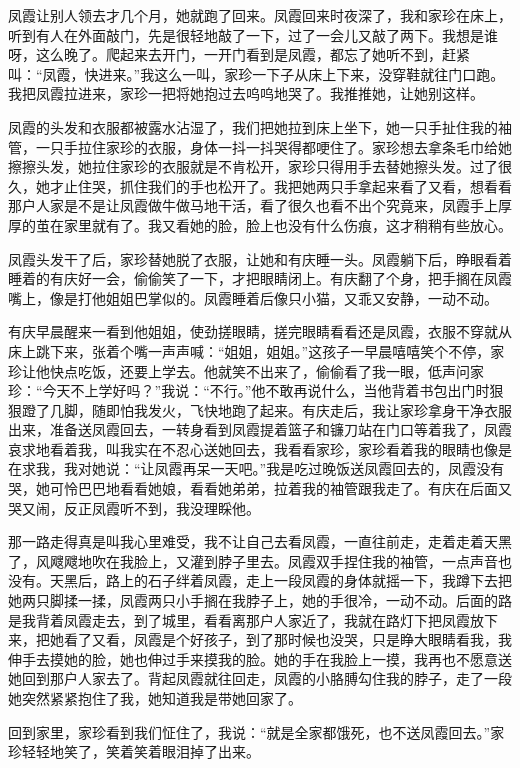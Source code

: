 \documentclass[12pt,UTF8]{ctexbook}
\begin{document}
凤霞让别人领去才几个月，她就跑了回来。凤霞回来时夜深了，我和家珍在床上，听到有人在外面敲门，先是很轻地敲了一下，过了一会儿又敲了两下。我想是谁呀，这么晚了。爬起来去开门，一开门看到是凤霞，都忘了她听不到，赶紧叫：“凤霞，快进来。”我这么一叫，家珍一下子从床上下来，没穿鞋就往门口跑。我把凤霞拉进来，家珍一把将她抱过去呜呜地哭了。我推推她，让她别这样。

凤霞的头发和衣服都被露水沾湿了，我们把她拉到床上坐下，她一只手扯住我的袖管，一只手拉住家珍的衣服，身体一抖一抖哭得都哽住了。家珍想去拿条毛巾给她擦擦头发，她拉住家珍的衣服就是不肯松开，家珍只得用手去替她擦头发。过了很久，她才止住哭，抓住我们的手也松开了。我把她两只手拿起来看了又看，想看看那户人家是不是让凤霞做牛做马地干活，看了很久也看不出个究竟来，凤霞手上厚厚的茧在家里就有了。我又看她的脸，脸上也没有什么伤痕，这才稍稍有些放心。

凤霞头发干了后，家珍替她脱了衣服，让她和有庆睡一头。凤霞躺下后，睁眼看着睡着的有庆好一会，偷偷笑了一下，才把眼睛闭上。有庆翻了个身，把手搁在凤霞嘴上，像是打他姐姐巴掌似的。凤霞睡着后像只小猫，又乖又安静，一动不动。

有庆早晨醒来一看到他姐姐，使劲搓眼睛，搓完眼睛看看还是凤霞，衣服不穿就从床上跳下来，张着个嘴一声声喊：“姐姐，姐姐。”这孩子一早晨嘻嘻笑个不停，家珍让他快点吃饭，还要上学去。他就笑不出来了，偷偷看了我一眼，低声问家珍：“今天不上学好吗？”我说：“不行。”他不敢再说什么，当他背着书包出门时狠狠蹬了几脚，随即怕我发火，飞快地跑了起来。有庆走后，我让家珍拿身干净衣服出来，准备送凤霞回去，一转身看到凤霞提着篮子和镰刀站在门口等着我了，凤霞哀求地看着我，叫我实在不忍心送她回去，我看看家珍，家珍看着我的眼睛也像是在求我，我对她说：“让凤霞再呆一天吧。”我是吃过晚饭送凤霞回去的，凤霞没有哭，她可怜巴巴地看看她娘，看看她弟弟，拉着我的袖管跟我走了。有庆在后面又哭又闹，反正凤霞听不到，我没理睬他。

那一路走得真是叫我心里难受，我不让自己去看凤霞，一直往前走，走着走着天黑了，风飕飕地吹在我脸上，又灌到脖子里去。凤霞双手捏住我的袖管，一点声音也没有。天黑后，路上的石子绊着凤霞，走上一段凤霞的身体就摇一下，我蹲下去把她两只脚揉一揉，凤霞两只小手搁在我脖子上，她的手很冷，一动不动。后面的路是我背着凤霞走去，到了城里，看看离那户人家近了，我就在路灯下把凤霞放下来，把她看了又看，凤霞是个好孩子，到了那时候也没哭，只是睁大眼睛看我，我伸手去摸她的脸，她也伸过手来摸我的脸。她的手在我脸上一摸，我再也不愿意送她回到那户人家去了。背起凤霞就往回走，凤霞的小胳膊勾住我的脖子，走了一段她突然紧紧抱住了我，她知道我是带她回家了。

回到家里，家珍看到我们怔住了，我说：“就是全家都饿死，也不送凤霞回去。”家珍轻轻地笑了，笑着笑着眼泪掉了出来。
\end{document}
